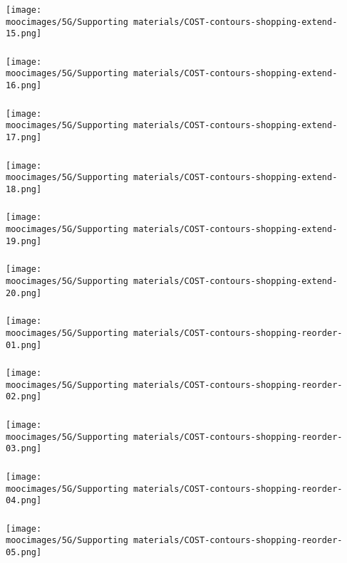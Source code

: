 \documentclass[handout,11pt,aspectratio=169,mathserif]{beamer}
\begin{document}
\begin{frame}\frametitle{}
	\centerline{\texttt{[image: \\moocimages/5G/Supporting materials/COST-contours-shopping-extend-15.png]}}
\end{frame}
\begin{frame}\frametitle{}
	\centerline{\texttt{[image: \\moocimages/5G/Supporting materials/COST-contours-shopping-extend-16.png]}}
\end{frame}
\begin{frame}\frametitle{}
	\centerline{\texttt{[image: \\moocimages/5G/Supporting materials/COST-contours-shopping-extend-17.png]}}
\end{frame}
\begin{frame}\frametitle{}
	\centerline{\texttt{[image: \\moocimages/5G/Supporting materials/COST-contours-shopping-extend-18.png]}}
\end{frame}
\begin{frame}\frametitle{}
	\centerline{\texttt{[image: \\moocimages/5G/Supporting materials/COST-contours-shopping-extend-19.png]}}
\end{frame}
\begin{frame}\frametitle{}
	\centerline{\texttt{[image: \\moocimages/5G/Supporting materials/COST-contours-shopping-extend-20.png]}}
\end{frame}
\begin{frame}\frametitle{}
	\centerline{\texttt{[image: \\moocimages/5G/Supporting materials/COST-contours-shopping-reorder-01.png]}}
\end{frame}
\begin{frame}\frametitle{}
	\centerline{\texttt{[image: \\moocimages/5G/Supporting materials/COST-contours-shopping-reorder-02.png]}}
\end{frame}
\begin{frame}\frametitle{}
	\centerline{\texttt{[image: \\moocimages/5G/Supporting materials/COST-contours-shopping-reorder-03.png]}}
\end{frame}
\begin{frame}\frametitle{}
	\centerline{\texttt{[image: \\moocimages/5G/Supporting materials/COST-contours-shopping-reorder-04.png]}}
\end{frame}
\begin{frame}\frametitle{}
	\centerline{\texttt{[image: \\moocimages/5G/Supporting materials/COST-contours-shopping-reorder-05.png]}}
\end{frame}
\end{document}
